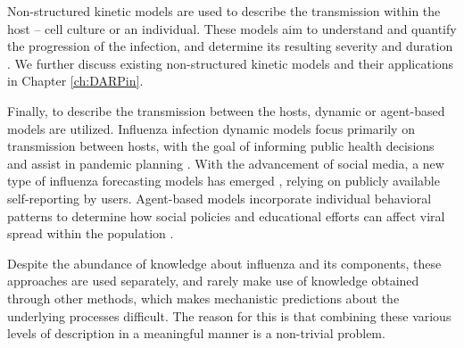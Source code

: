 Non-structured kinetic models are used to describe the transmission within the host – cell culture or an individual. These models aim to understand and quantify the progression of the infection, and determine its resulting severity and duration \cite{beauchemin2008modeling}. We further discuss existing non-structured kinetic models and their applications in Chapter \ref{ch:DARPin}.

Finally, to describe the transmission between the hosts, dynamic or agent-based models are utilized. Influenza infection dynamic models focus primarily on transmission between hosts, with the goal of informing public health decisions and assist in pandemic planning \cite{ferguson2006strategies, mcvernon2007model}. With the advancement of social media, a new type of influenza forecasting models has emerged \cite{pawelek2014modeling, santillana2015combining, levy2018modeling}, relying on publicly available self-reporting by users. Agent-based models incorporate individual behavioral patterns to determine how social policies and educational efforts can affect viral spread within the population \cite{karimi2015effect}.

Despite the abundance of knowledge about influenza and its components, these approaches are used separately, and rarely make use of knowledge obtained through other methods, which makes mechanistic predictions about the underlying processes difficult. The reason for this is that combining these various levels of description in a meaningful manner is a non-trivial problem.
